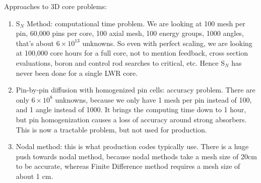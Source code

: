 \documentclass{school-22.211-notes}
\begin{document}
Approaches to 3D core problems:
\begin{enumerate}
\item S$_N$ Method: computational time problem. We are looking at 100 mesh per pin, 60,000 pins per core, 100 axial mesh, 100 energy groups, 1000 angles, that's about $6 \times 10^{13}$ unknowns. So even with perfect scaling, we are looking at 100,000 core hours for a full core, not to mention feedback, cross section evaluations, boron and control rod searches to critical, etc. Hence S$_N$ has never been done for a single LWR core. 

\item Pin-by-pin diffusion with homogenized pin cells: accuracy problem. There are only $6 \times 10^8$ unknowns, because we only have 1 mesh per pin instead of 100, and 1 angle instead of 1000. It brings the computing time down to 1 hour, but pin homogenization causes a loss of accuracy around strong absorbers. This is now a tractable problem, but not used for production.

\item Nodal method: this is what production codes typically use. There is a huge push towards nodal method, because nodal methods take a mesh size of 20cm to be accurate, whereas Finite Difference method requires a mesh size of about 1 cm. 
\end{enumerate}
\end{document}
